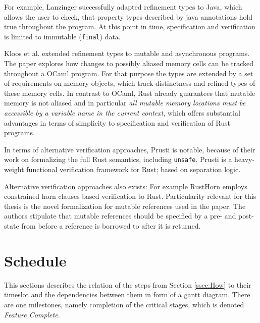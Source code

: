 \documentclass[11pt]{article}
\newcommand{\code}[1]{\texttt{#1}}
\begin{document}
For example, Lanzinger \cite{lanzinger_property_2021} successfully adapted refinement types to Java, which allows the user to check, that property types described by java annotations hold true throughout the program. At this point in time, specification and verification is limited to immutable (\code{final}) data.

Kloos et al. \cite{kloos_asynchronous_2015} extended refinement types to mutable and asynchronous programs. The paper explores how changes to possibly aliased memory cells can be tracked throughout a OCaml program. For that purpose the types are extended by a set of requirements on memory objects, which track distinctness and refined types of these memory cells. In contrast to OCaml, Rust already guarantees that mutable memory is not aliased and in particular \textit{all mutable memory locations must be accessible by a variable name in the current context}, which offers substantial advantages in terms of simplicity to specification and verification of Rust programs.

In terms of alternative verification approaches, Prusti\cite{astrauskas_leveraging_2019} is notable, because of their work on formalizing the full Rust semantics, including \code{unsafe}. Prusti is a heavy-weight functional verification framework for Rust; based on separation logic.

Alternative verification approaches also exists: For example RustHorn\cite{matsushita_rusthorn_2020} employs constrained horn clauses based verification to Rust. Particularity relevant for this thesis is the novel formalization for mutable references used in the paper. The authors stipulate that mutable references should be specified by a pre- and post-state from before a reference is borrowed to after it is returned.

\section{Schedule} \label{sec:schedule}

This sections describes the relation of the steps from Section \ref{ssec:How} to their timeslot and the dependencies between them in form of a gantt diagram. There are one milestones, namely completion of the critical stages, which is denoted \textit{Feature Complete}.


\end{document}

